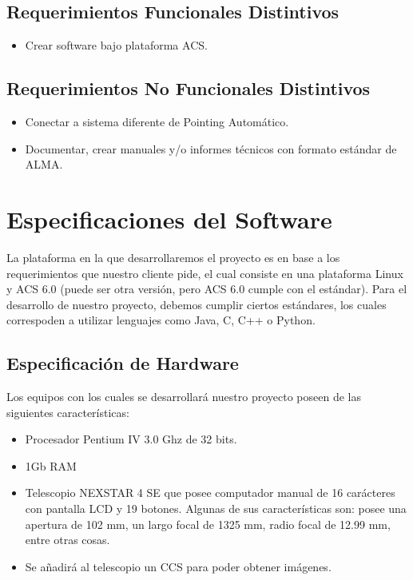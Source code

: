 \documentclass[letterpaper,spanish,10pt]{article}
\begin{document}
\subsection{Requerimientos Funcionales Distintivos}
\begin{itemize}
	\item Crear software bajo plataforma ACS.
\end{itemize}

\subsection{Requerimientos No Funcionales Distintivos}
\begin{itemize}
	\item Conectar a sistema diferente de Pointing Autom\'atico.
	\item Documentar, crear manuales y/o informes t\'ecnicos con formato est\'andar de ALMA.
\end{itemize}


\newpage


\section{Especificaciones del Software}
La plataforma en la que desarrollaremos el proyecto es en base a los requerimientos que nuestro cliente pide, el cual consiste en una plataforma Linux y ACS 6.0 (puede ser otra versi\'on, pero ACS 6.0 cumple con el est\'andar).
Para el desarrollo de nuestro proyecto, debemos cumplir ciertos est\'andares, los cuales correspoden a utilizar lenguajes como Java, C, C++ o Python.

\subsection{Especificaci\'on de Hardware}
Los equipos con los cuales se desarrollar\'a nuestro proyecto poseen de las siguientes caracter\'isticas:

\begin{itemize}
	\item Procesador Pentium IV 3.0 Ghz de 32 bits.
	\item 1Gb RAM
	\item Telescopio NEXSTAR 4 SE que posee computador manual de 16 car\'acteres con pantalla LCD y 19 botones. Algunas de sus caracter\'isticas son: posee una apertura de 102 mm, un largo focal de 1325 mm, radio focal de 12.99 mm, entre otras cosas.
	\item Se a\~nadir\'a al telescopio un CCS para poder obtener im\'agenes.
\end{itemize}
\end{document}
